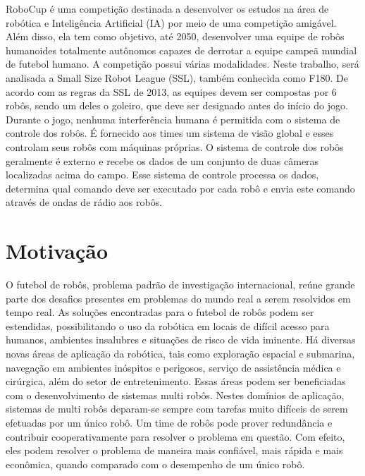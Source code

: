 RoboCup é uma competição destinada a desenvolver os estudos na área de robótica
e Inteligência Artificial (IA) por meio de uma competição amigável. Além disso,
ela tem como objetivo, até 2050, desenvolver uma equipe de robôs humanoides
totalmente autônomos capazes de derrotar a equipe campeã mundial de futebol
humano. A competição possui várias modalidades. Neste trabalho, será analisada a
Small Size Robot League (SSL), também conhecida como F180. De acordo com as
regras da SSL de 2013, as equipes devem ser compostas por 6 robôs, sendo um deles o
goleiro, que deve ser designado antes do início do jogo. Durante o jogo, nenhuma
interferência humana é permitida com o sistema de controle dos robôs. É
fornecido aos times um sistema de visão global e esses controlam seus robôs com
máquinas próprias. O sistema de controle dos robôs geralmente é externo e recebe
os dados de um conjunto de duas câmeras localizadas acima do campo. Esse sistema
de controle processa os dados, determina qual comando deve ser executado por
cada robô e envia este comando através de ondas de rádio aos robôs.

\section{Motivação}


O futebol de robôs, problema padrão de investigação internacional, reúne grande
parte dos desafios presentes em problemas do mundo real a serem resolvidos em
tempo real. As soluções encontradas para o futebol de robôs podem ser
estendidas, possibilitando o uso da robótica em locais de difícil acesso para
humanos, ambientes insalubres e situações de risco de vida iminente.  Há
diversas novas áreas de aplicação da robótica, tais como exploração espacial e
submarina, navegação em ambientes inóspitos e perigosos, serviço de assistência
médica e cirúrgica, além do setor de entretenimento. Essas áreas podem ser
beneficiadas com o desenvolvimento de sistemas multi robôs. Nestes domínios de
aplicação, sistemas de multi robôs deparam-se sempre com tarefas muito difíceis
de serem efetuadas por um único robô.  Um time de robôs pode prover redundância
e contribuir cooperativamente para resolver o problema em questão. Com efeito,
eles podem resolver o problema de maneira mais confiável, mais rápida e mais
econômica, quando comparado com o desempenho de um único robô.

